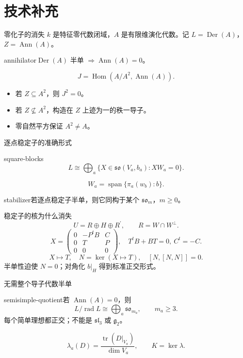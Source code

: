 \documentclass{beamer}
\begin{document}
\section{技术补充}
\begin{frame}{零化子的消失}
{\small $k$ 是特征零代数闭域，$A$ 是有限维演化代数。记 $L=\operatorname{Der}(A)$，$Z=\operatorname{Ann}(A)$。}
\begin{bookresult}{annihilator}$\operatorname{Der}(A)$ 半单 $\Longrightarrow\operatorname{Ann}(A)=0$。\end{bookresult}\[J=\operatorname{Hom}(A/A^2,\operatorname{Ann}(A)).\]\begin{itemize}\item 若 $Z\subseteq A^2$，则 $J^2=0$。\item 若 $Z\not\subseteq A^2$，构造在 $Z$ 上迹为一的秩一导子。\item 零自然平方保证 $A^2\ne A$。\end{itemize}
\end{frame}
\begin{frame}{逐点稳定子的准确形式}
\begin{bookresult}{square-blocks}\[L\cong\bigoplus_a\{X\in\mathfrak{so}(V_a,b_a):XW_a=0\}.\]\end{bookresult}\[W_a=\operatorname{span}\{\pi_a(w_b):b\}.\]\begin{bookresult}{stabilizer}若逐点稳定子半单，则它同构于某个 $\mathfrak{so}_m$，$m\ge0$。\end{bookresult}
\end{frame}
\begin{frame}{稳定子的核为什么消失}
\[U=R\oplus H\oplus R^{\prime},\qquad R=W\cap W^\perp.\]\[X=\begin{pmatrix}0&-P^tB&C\\0&T&P\\0&0&0\end{pmatrix},\quad T^tB+BT=0,\ C^t=-C.\]\[X\longmapsto T,\quad N=\ker(X\mapsto T),\quad[N,[N,N]]=0.\]半单性迫使 $N=0$；对角化 $b|_H$ 得到标准正交形式。
\end{frame}
\begin{frame}{无需整个导子代数半单}
\begin{bookresult}{semisimple-quotient}若 $\operatorname{Ann}(A)=0$，则\[L/\operatorname{rad}L\cong\bigoplus_a\mathfrak{so}_{m_a},\qquad m_a\ge3.\]每个简单理想都正交；不能是 $\mathfrak{sl}_3$ 或 $\mathfrak g_2$。\end{bookresult}\[\lambda_a(D)=\frac{\operatorname{tr}(D|_{V_a})}{\dim V_a},\qquad K=\ker\lambda.\]
\end{frame}
\end{document}
